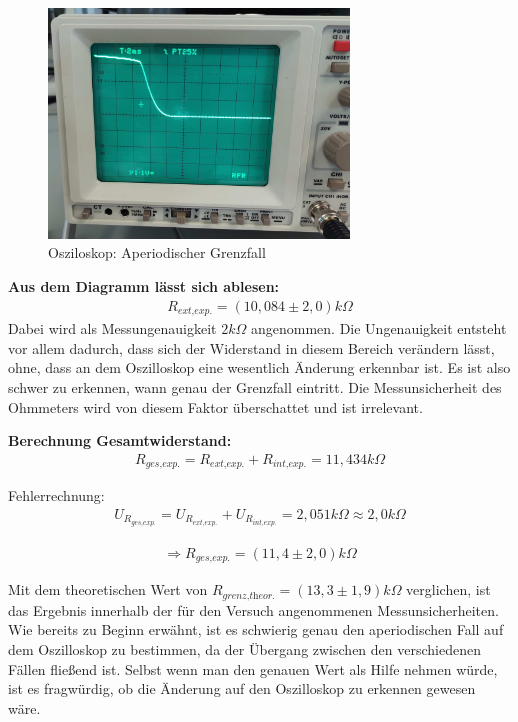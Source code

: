 \documentclass[a4paper]{scrartcl}
\numberwithin{equation}{subsection}
\begin{document}
\begin{figure}[H]
\includegraphics[width=8cm]{Bild_Osziloskop-Grenzfall}
\centering
\caption{Osziloskop: Aperiodischer Grenzfall}
\centering
\end{figure}

\textbf{Aus dem Diagramm lässt sich ablesen:}
\begin{align*}
R_{\textit{ext,exp.}} = (10,084\pm2,0)k\Omega
\end{align*}
Dabei wird als Messungenauigkeit $2k\Omega$ angenommen. Die Ungenauigkeit entsteht vor allem dadurch, dass sich der Widerstand in diesem Bereich verändern lässt, ohne, dass an dem Oszilloskop eine wesentlich Änderung erkennbar ist. Es ist also schwer zu erkennen, wann genau der Grenzfall eintritt.
Die Messunsicherheit des Ohmmeters wird von diesem Faktor überschattet und ist irrelevant.

\textbf{Berechnung Gesamtwiderstand:}
\begin{align}
R_{\textit{ges,exp.}} = R_{\textit{ext,exp.}} + R_{\textit{int,exp.}} = 11,434k\Omega 
\end{align}

Fehlerrechnung:
\begin{align*}
U_{R_{\textit{ges,exp.}}} = U_{R_{\textit{ext,exp.}}} + U_{R_{\textit{int,exp.}}} = 2,051k\Omega \approx 2,0k\Omega
\end{align*}

\begin{align*}
\Rightarrow R_{\textit{ges,exp.}} = (11,4 \pm 2,0) k\Omega
\end{align*}

Mit dem theoretischen Wert von $R_{\textit{grenz,theor.}} = (13,3 \pm 1,9)k \Omega$ verglichen, ist das Ergebnis innerhalb der für den Versuch angenommenen Messunsicherheiten. Wie bereits zu Beginn erwähnt, ist es schwierig genau den aperiodischen Fall auf dem Oszilloskop zu bestimmen, da der Übergang zwischen den verschiedenen Fällen fließend ist. Selbst wenn man den genauen Wert als Hilfe nehmen würde, ist es fragwürdig, ob die Änderung auf den Oszilloskop zu erkennen gewesen wäre.
\end{document}
